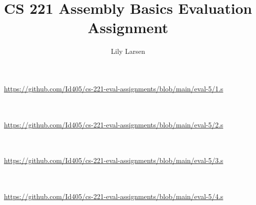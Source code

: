 \documentclass{article}
\title{CS 221 Assembly Basics Evaluation Assignment}
\author{Lily Larsen}
\newcommand{\nicecode}[2]{\inputminted[linenos=true,breaklines,fontsize=\small]{#1}{#2}}
\begin{document}
\maketitle
\newpage

\section{}
\vspace{2ex} \par
\url{https://github.com/Id405/cs-221-eval-assignments/blob/main/eval-5/1.s}
\nicecode{asm}{1.s}
\newpage

\section{}
\vspace{2ex} \par
\url{https://github.com/Id405/cs-221-eval-assignments/blob/main/eval-5/2.s}
\nicecode{asm}{2.s}
\newpage

\section{}
\vspace{2ex} \par
\url{https://github.com/Id405/cs-221-eval-assignments/blob/main/eval-5/3.s}
\nicecode{asm}{3.s}
\newpage

\section{}
\vspace{2ex} \par
\url{https://github.com/Id405/cs-221-eval-assignments/blob/main/eval-5/4.s}
\nicecode{asm}{4.s}
\newpage

\newpage
\end{document}
